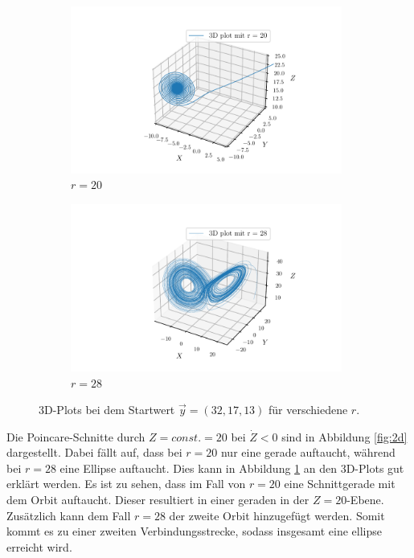 \begin{figure}
    \begin{subfigure}{0.48\textwidth}
        \centering
        \includegraphics[height = 5.5cm]{build/pr20_3d.pdf}
        \caption{$r = 20$}
    \end{subfigure}
    \hfill
    \begin{subfigure}{0.48\textwidth}
        \centering
        \includegraphics[height = 5.5cm]{build/pr28_3d.pdf}
        \caption{$r = 28$}
    \end{subfigure}
    \caption{3D-Plots bei dem Startwert $\vec{y} = (32, 17, 13)$ für verschiedene $r$.}
    \label{fig:2c}
\end{figure}
Die Poincare-Schnitte durch $Z = const. = 20$ bei $\dot{Z} < 0$ sind in Abbildung \ref{fig:2d} dargestellt. Dabei fällt auf, dass bei $r = 20$ nur eine gerade auftaucht, während bei 
$r = 28$ eine Ellipse auftaucht. Dies kann in Abbildung \ref{fig:2c} an den 3D-Plots gut erklärt werden. Es ist zu sehen, dass im Fall von $r = 20$ eine Schnittgerade mit
dem Orbit auftaucht. Dieser resultiert in einer geraden in der $Z = 20$-Ebene. Zusätzlich kann dem Fall $r = 28$ der zweite Orbit hinzugefügt werden. Somit kommt es zu einer zweiten Verbindungsstrecke, sodass insgesamt eine ellipse erreicht wird.
